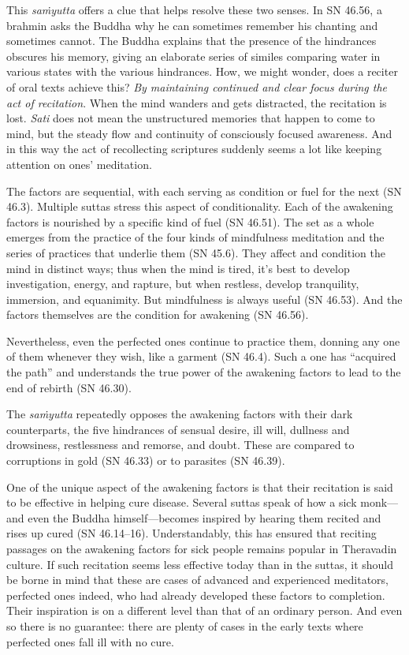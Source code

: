 \documentclass[12pt,openany]{book}%
\begin{document}
This \textit{\textsanskrit{saṁyutta}} offers a clue that helps resolve these two senses. In SN 46.56, a brahmin asks the Buddha why he can sometimes remember his chanting and sometimes cannot. The Buddha explains that the presence of the hindrances obscures his memory, giving an elaborate series of similes comparing water in various states with the various hindrances. How, we might wonder, does a reciter of oral texts achieve this? \emph{By maintaining continued and clear focus during the act of recitation}. When the mind wanders and gets distracted, the recitation is lost. \textit{Sati} does not mean the unstructured memories that happen to come to mind, but the steady flow and continuity of consciously focused awareness. And in this way the act of recollecting scriptures suddenly seems a lot like keeping attention on ones’ meditation.

The factors are sequential, with each serving as condition or fuel for the next (SN 46.3). Multiple suttas stress this aspect of conditionality. Each of the awakening factors is nourished by a specific kind of fuel (SN 46.51). The set as a whole emerges from the practice of the four kinds of mindfulness meditation and the series of practices that underlie them (SN 45.6). They affect and condition the mind in distinct ways; thus when the mind is tired, it’s best to develop investigation, energy, and rapture, but when restless, develop tranquility, immersion, and equanimity. But mindfulness is always useful (SN 46.53). And the factors themselves are the condition for awakening (SN 46.56).

Nevertheless, even the perfected ones continue to practice them, donning any one of them whenever they wish, like a garment (SN 46.4). Such a one has “acquired the path” and understands the true power of the awakening factors to lead to the end of rebirth (SN 46.30).

The \textit{\textsanskrit{saṁyutta}} repeatedly opposes the awakening factors with their dark counterparts, the five hindrances of sensual desire, ill will, dullness and drowsiness, restlessness and remorse, and doubt. These are compared to corruptions in gold (SN 46.33) or to parasites (SN 46.39).

One of the unique aspect of the awakening factors is that their recitation is said to be effective in helping cure disease. Several suttas speak of how a sick monk—and even the Buddha himself—becomes inspired by hearing them recited and rises up cured (SN 46.14–16). Understandably, this has ensured that reciting passages on the awakening factors for sick people remains popular in Theravadin culture. If such recitation seems less effective today than in the suttas, it should be borne in mind that these are cases of advanced and experienced meditators, perfected ones indeed, who had already developed these factors to completion. Their inspiration is on a different level than that of an ordinary person. And even so there is no guarantee: there are plenty of cases in the early texts where perfected ones fall ill with no cure.
\end{document}
